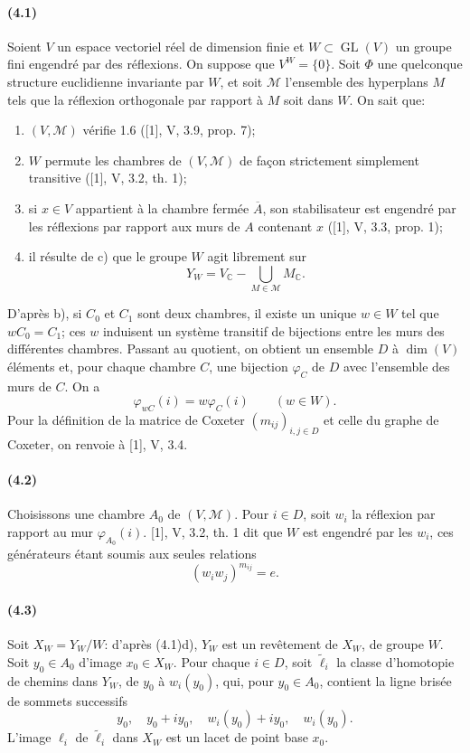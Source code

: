 \documentclass[10pt]{article}
\newcommand{\C}{\mathbb C}
\newcommand{\GL}{\operatorname{GL}}
\begin{document}
\paragraph{(4.1)} Soient \(V\) un espace vectoriel réel de dimension finie et \(W\subset\GL(V)\) un groupe fini engendré par des réflexions. On suppose que \(V^W=\{0\}\). Soit \(\Phi\) une quelconque structure euclidienne invariante par \(W\), et soit \(\mathcal M\) l'ensemble des hyperplans \(M\) tels que la réflexion orthogonale par rapport à \(M\) soit dans \(W\). On sait que:
\begin{enumerate}[label=\alph*)]
\item \((V,\mathcal M)\) vérifie 1.6 ([1], V, 3.9, prop. 7);
\item \(W\) permute les chambres de \((V,\mathcal M)\) de façon strictement simplement transitive ([1], V, 3.2, th. 1);
\item si \(x\in V\) appartient à la chambre fermée \(\overline A\), son stabilisateur est engendré par les réflexions par rapport aux murs de \(A\) contenant \(x\) ([1], V, 3.3, prop. 1);
\item il résulte de c) que le groupe \(W\) agit librement sur
\[
Y_W=V_\C-\bigcup_{M\in\mathcal M}M_\C.
\]
\end{enumerate}
D'après b), si \(C_0\) et \(C_1\) sont deux chambres, il existe un unique \(w\in W\) tel que \(wC_0=C_1\); ces \(w\) induisent un système transitif de bijections entre les murs des différentes chambres. Passant au quotient, on obtient un ensemble \(D\) à \(\dim(V)\) éléments et, pour chaque chambre \(C\), une bijection \(\varphi_C\) de \(D\) avec l'ensemble des murs de \(C\). On a
\[
\tag{4.1.1}
\varphi_{wC}(i)=w\varphi_C(i)\qquad(w\in W).
\]
Pour la définition de la matrice de Coxeter \((m_{ij})_{i,j\in D}\) et celle du graphe de Coxeter, on renvoie à [1], V, 3.4.

\paragraph{(4.2)} Choisissons une chambre \(A_0\) de \((V,\mathcal M)\). Pour \(i\in D\), soit \(w_i\) la réflexion par rapport au mur \(\varphi_{A_0}(i)\). [1], V, 3.2, th. 1 dit que \(W\) est engendré par les \(w_i\), ces générateurs étant soumis aux seules relations
\[
(w_iw_j)^{m_{ij}}=e.
\]

\paragraph{(4.3)} Soit \(X_W=Y_W/W\): d'après (4.1)d), \(Y_W\) est un revêtement de \(X_W\), de groupe \(W\). Soit \(y_0\in A_0\) d'image \(x_0\in X_W\). Pour chaque \(i\in D\), soit \(\widetilde \ell_i\) la classe d'homotopie de chemins dans \(Y_W\), de \(y_0\) à \(w_i(y_0)\), qui, pour \(y_0\in A_0\), contient la ligne brisée de sommets successifs
\[
y_0,\quad y_0+iy_0,\quad w_i(y_0)+iy_0,\quad w_i(y_0).
\]
L'image \(\ell_i\) de \(\widetilde\ell_i\) dans \(X_W\) est un lacet de point base \(x_0\).
\end{document}
